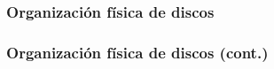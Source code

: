 \begin{frame}
	\frametitle{Organización física de discos}
	\begin{figure}
	\end{figure}
\end{frame}

\begin{frame}
	\frametitle{Organización física de discos (cont.)}
	\begin{figure}
	\end{figure}
\end{frame}

